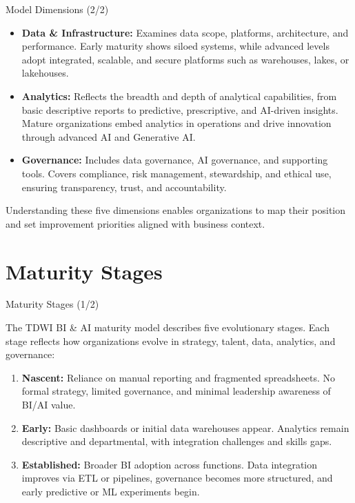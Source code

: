 \documentclass[aspectratio=169, table]{beamer}
\begin{document}
\begin{frame}{Model Dimensions (2/2)}
	\vspace{20pt}
	
	\begin{itemize}
		\item \textbf{Data \& Infrastructure:} Examines data scope, platforms, architecture, and performance. 
		Early maturity shows siloed systems, while advanced levels adopt integrated, scalable, and secure 
		platforms such as warehouses, lakes, or lakehouses.
		
		\item \textbf{Analytics:} Reflects the breadth and depth of analytical capabilities, from basic 
		descriptive reports to predictive, prescriptive, and AI-driven insights. Mature organizations embed 
		analytics in operations and drive innovation through advanced AI and Generative AI.
		
		\item \textbf{Governance:} Includes data governance, AI governance, and supporting tools. 
		Covers compliance, risk management, stewardship, and ethical use, ensuring transparency, 
		trust, and accountability.
	\end{itemize}
	
	Understanding these five dimensions enables organizations to map their position 
	and set improvement priorities aligned with business context.
	
\end{frame}

\section{Maturity Stages}

\begin{frame}{Maturity Stages (1/2)}
	\vspace{20pt}
	
	The TDWI BI \& AI maturity model describes five evolutionary stages.  
	Each stage reflects how organizations evolve in strategy, talent, data, analytics, and governance:
	
	\begin{enumerate}
		\item \textbf{Nascent:} Reliance on manual reporting and fragmented spreadsheets.  
		No formal strategy, limited governance, and minimal leadership awareness of BI/AI value.  
		
		\item \textbf{Early:} Basic dashboards or initial data warehouses appear.  
		Analytics remain descriptive and departmental, with integration challenges and skills gaps.  
		
		\item \textbf{Established:} Broader BI adoption across functions.  
		Data integration improves via ETL or pipelines, governance becomes more structured, 
		and early predictive or ML experiments begin.  
	\end{enumerate}
	
\end{frame}
\end{document}
